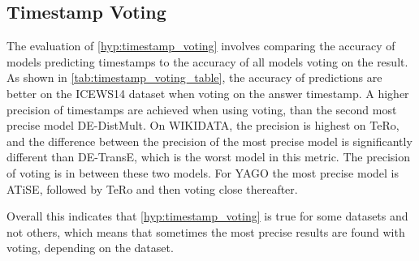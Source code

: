 \subsection{Timestamp Voting}
\label{seubsec:timestamp_voting_experiment}



The evaluation of \autoref{hyp:timestamp_voting} involves comparing the accuracy of models predicting timestamps to the accuracy of all models voting on the result. As shown in \autoref{tab:timestamp_voting_table}, the accuracy of predictions are better on the ICEWS14 dataset when voting on the answer timestamp. A higher precision of timestamps are achieved when using voting, than the second most precise model DE-DistMult. On WIKIDATA, the precision is highest on TeRo, and the difference between the precision of the most precise model is significantly different than DE-TransE, which is the worst model in this metric. The precision of voting is in between these two models. For YAGO the most precise model is ATiSE, followed by TeRo and then voting close thereafter.

Overall this indicates that \autoref{hyp:timestamp_voting} is true for some datasets and not others, which means that sometimes the most precise results are found with voting, depending on the dataset.

